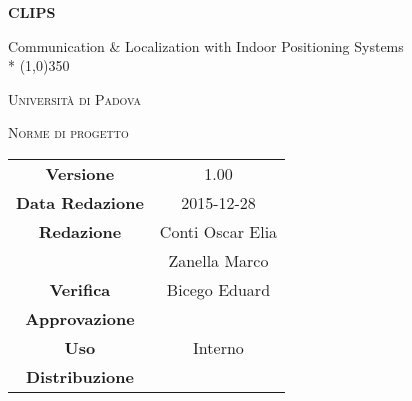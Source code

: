 \documentclass[a4paper,12pt]{article}
\author{Conti Oscar Elia, Zanella Marco}
\date{24/12/2015}
\begin{document}
\begin{titlepage}
	\centering
	{\huge\bfseries CLIPS\par}
	Communication \& Localization with Indoor Positioning Systems \\*
	\line(1,0){350} \\
	{\scshape\LARGE Università di Padova \par}
	\vspace{1cm}
	{\scshape\Large Norme di progetto \par}
	\logo
	\newpage
		\begin{tabular}{c|c}
			{\hfill \textbf{Versione}} 			& 1.00			\\
			{\hfill\textbf{Data Redazione}} 		& 2015-12-28  		\\ 
			{\hfill\textbf{Redazione}} 			&  Conti Oscar Elia \\ 
											&  Zanella Marco       \\
			{\hfill\textbf{Verifica}} 				&  Bicego Eduard   \\
			{\hfill\textbf{Approvazione}} 		&  \\
			{\hfill\textbf{Uso}} 					& Interno			\\
			{\hfill\textbf{Distribuzione}} 			& \leaf			\\
		\end{tabular}
	\end{titlepage}
	\newpage
	\pagestyle{myfront}
	
	\newpage
	\tableofcontents	
	\label{LastFrontPage}
	\newpage
	\pagestyle{mymain}
         
         	\newpage
		

	\newpage
		
	
	\newpage
		
	
	\newpage
		
		
	\label{LastPage}
\end{document}
